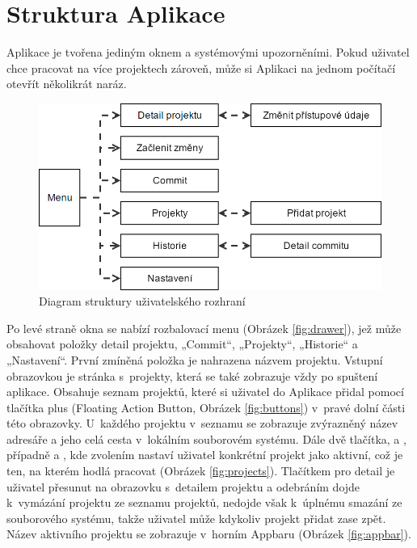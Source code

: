 \section{Struktura Aplikace}

Aplikace je tvořena jediným oknem a systémovými upozorněními. Pokud uživatel chce pracovat na více projektech zároveň, může si Aplikaci na jednom počítačí otevřít několikrát naráz.

\FloatBarrier
\begin{figure}[ht]
	\centering
	\includegraphics[width=\textwidth]{sections/ui/images/flow.png}
	\caption{Diagram struktury uživatelského rozhraní}
\end{figure}
\FloatBarrier

Po levé straně okna se nabízí rozbalovací menu (Obrázek \ref{fig:drawer}), jež může obsahovat položky detail projektu, „Commit“, „Projekty“, „Historie“ a „Nastavení“. První zmíněná položka je nahrazena názvem projektu. Vstupní obrazovkou je stránka s~projekty, která se také zobrazuje vždy po spuštení aplikace. Obsahuje seznam projektů, které si uživatel do Aplikace přidal pomocí tlačítka plus (Floating Action Button, Obrázek \ref{fig:buttons}) v~pravé dolní části této obrazovky. U~každého projektu v~seznamu se zobrazuje zvýrazněný název adresáře a jeho celá cesta v~lokálním souborovém systému. Dále dvě tlačítka,  a , případně  a , kde zvolením nastaví uživatel konkrétní projekt jako aktivní, což je ten, na kterém hodlá pracovat (Obrázek \ref{fig:projects}). Tlačítkem pro detail je uživatel přesunut na obrazovku s~detailem projektu a odebráním dojde k~vymázání projektu ze seznamu projektů, nedojde však k~úplnému smazání ze souborového systému, takže uživatel může kdykoliv projekt přidat zase zpět. Název aktivního projektu se zobrazuje v~horním Appbaru (Obrázek \ref{fig:appbar}).

